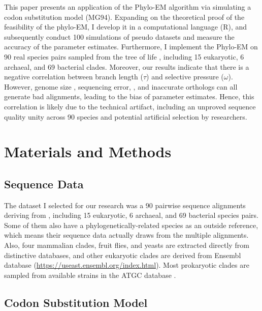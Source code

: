 This paper presents an application of the Phylo-EM algorithm via simulating a codon substitution model (MG94). Expanding on the theoretical proof of the feasibility of the phylo-EM, I develop it in a computational language (R), and subsequently conduct 100 simulations of pseudo datasets and measure the accuracy of the parameter estimates. Furthermore, I implement the Phylo-EM on 90 real species pairs sampled from the tree of life \parencite{zou2021nonsynonymous}, including 15 eukaryotic, 6 archaeal, and 69 bacterial clades. Moreover, our results indicate that there is a negative correlation between branch length ($\tau$) and selective pressure ($\omega$). However, genome size \parencite{simpson2014exploring}, sequencing error, \parencite{schneider2009estimates}, and inaccurate orthologs can all generate bad alignments, leading to the bias of parameter estimates.  Hence, this correlation is likely due to the technical artifact, including an unproved sequence quality unity across 90 species and potential artificial selection by researchers.


\section{Materials and Methods}
\subsection{Sequence Data}
The dataset I selected for our research was a 90 pairwise sequence alignments deriving from \cite{zou2021nonsynonymous}, including 15 eukaryotic, 6 archaeal, and 69 bacterial species pairs. Some of them also have a phylogenetically-related species as an outside reference, which means their sequence data actually draws from the multiple alignments. Also, four mammalian clades, fruit flies, and yeasts are extracted directly from distinctive databases, and other eukaryotic clades are derived from Ensembl database (\href{https://useast.ensembl.org/index.html}{https://useast.ensembl.org/index.html}). Most prokaryotic clades are sampled from available strains in the ATGC database \parencite{kristensen2016atgc}.

\subsection{Codon Substitution Model}
